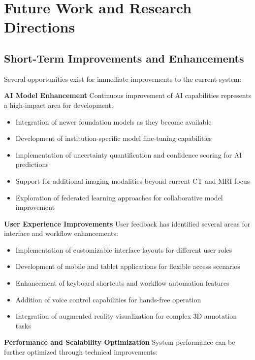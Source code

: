 \section{Future Work and Research Directions}

\subsection{Short-Term Improvements and Enhancements}

Several opportunities exist for immediate improvements to the current system:

\textbf{AI Model Enhancement}
Continuous improvement of AI capabilities represents a high-impact area for development:

\begin{itemize}
    \item Integration of newer foundation models as they become available
    \item Development of institution-specific model fine-tuning capabilities
    \item Implementation of uncertainty quantification and confidence scoring for AI predictions
    \item Support for additional imaging modalities beyond current CT and MRI focus
    \item Exploration of federated learning approaches for collaborative model improvement
\end{itemize}

\textbf{User Experience Improvements}
User feedback has identified several areas for interface and workflow enhancements:

\begin{itemize}
    \item Implementation of customizable interface layouts for different user roles
    \item Development of mobile and tablet applications for flexible access scenarios
    \item Enhancement of keyboard shortcuts and workflow automation features
    \item Addition of voice control capabilities for hands-free operation
    \item Integration of augmented reality visualization for complex 3D annotation tasks
\end{itemize}

\textbf{Performance and Scalability Optimization}
System performance can be further optimized through technical improvements:

